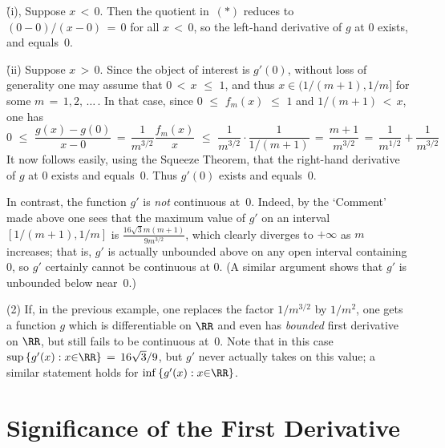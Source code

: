 {    \h (i), Suppose $x\,<\,0$. Then the quotient in~$({\ast})$ reduces to $(0-0)/(x-0) \,=\, 0$ for all $x\,<\,0$, so the left-hand derivative of $g$ at $0$ exists, and equals~$0$.

        \h (ii) Suppose $x\,>\,0$. Since the object of interest is $g'(0)$, without loss of generality one may assume that $0\,<\,x\,\,{\leq}\,\,1$,
    and thus $x{\in}(1/(m+1),1/m]$ for some $m \,=\, 1,2,\,{\ldots}\,$.
    In that case, since $0\,\,{\leq}\,\,f_{m}(x)\,\,{\leq}\,\,1$ and $1/(m+1)\,<\,x$, one has
        \begin{displaymath}
        0\,\,{\leq}\,\,\frac{g(x)-g(0)}{x-0} \,=\, \frac{1}{m^{3/2}}\frac{f_{m}(x)}{x}\,\,{\leq}\,\, \frac{1}{m^{3/2}}{\cdot}\frac{1}{1/(m+1)} \,=\, \frac{m+1}{m^{3/2}} \,=\, 
    \frac{1}{m^{1/2}} + \frac{1}{m^{3/2}}
        \end{displaymath}
    It now follows easily, using the Squeeze Theorem, that the right-hand derivative of $g$ at $0$ exists and equals~$0$.
    Thus $g'(0)$ exists and equals~$0$.


        In contrast, the function $g'$ is {\em not} continuous at~$0$.
    Indeed, by the `Comment' made above one sees that the maximum value of $g'$ on an interval $[1/(m+1),1/m]$ is ${\displaystyle \frac{16\sqrt{3}m(m+1)}{9m^{3/2}}}$, which clearly diverges to $+{\infty}$ as $m$ increases; that is, $g'$ is actually unbounded above on any open interval containing $0$, so $g'$ certainly cannot be continuous at $0$.
    (A similar argument shows that $g'$ is unbounded below near~$0$.)

\V

        (2) If, in the previous example, one replaces the factor $1/m^{3/2}$ by $1/m^{2}$,
    one gets a function $g$ which is differentiable on ${\RR}$ and even has {\em bounded} first derivative on ${\RR}$, but still fails to be continuous at~$0$.
    Note that in this case ${\sup}\,\{g'(x):x{\in}{\RR}\} \,=\, 16\sqrt{3}/9$, but $g'$ never actually takes on this value; a similar statement holds for ${\inf}\,\{g'(x):x{\in}{\RR}\}$.
}%

\VV

                \section{{\bf Significance of the First Derivative}}
                \label{SectE40}

